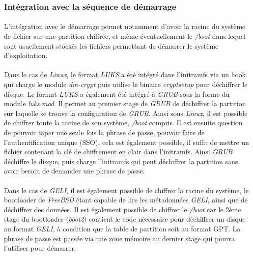 \subsubsection{Intégration avec la séquence de démarrage}
\paragraph{}
L'intégration avec le démarrage permet notamment d'avoir la racine du système 
de fichier sur une partition chiffrée, et même éventuellement le {\em /boot}
dans lequel sont usuellement stockés les fichiers permettant de démarrer le 
système d'exploitation.

\paragraph{}
Dans le cas de {\em Linux}, le format {\em LUKS} a été intégré dans
l'initramfs via un hook qui charge le module {\em dm-crypt} puis utilise 
le binaire {\em cryptsetup} pour déchiffrer le disque. 
Le format {\em LUKS} a également été intégré à {\em GRUB} sous la 
forme du module {\em luks.mod}. Il permet au premier stage de {\em GRUB} de 
déchiffrer la partition sur laquelle se trouve la configuration de {\em GRUB}.
Ainsi sous {\em Linux}, il est possible de chiffrer toute la racine de son 
système, {\em /boot} compris. Il est ensuite question de pouvoir taper une 
seule fois la phrase de passe, 
pouvoir faire de l'authentification unique (SSO), cela est 
également possible, il suffit de mettre un fichier contenant la clé de 
chiffrement en clair dans l'initramfs. Ainsi {\em GRUB} déchiffre le disque, 
puis charge l'initramfs qui peut déchiffrer la partition sans avoir besoin 
de demander une phrase de passe.

\paragraph{}
Dans le cas de {\em GELI}, il est également possible de chiffrer la racine du 
système, le bootloader de {\em FreeBSD} étant capable de lire les métadonnées 
{\em GELI}, ainsi que de déchiffrer des données. 
Il est également possible de chiffrer le 
{\em /boot} car le 2ème stage du bootloader ({\em boot2}) contient le code 
nécessaire pour déchiffrer un disque au format {\em GELI}, à condition que 
la table de partition soit au format GPT. La phrase de passe est passée via 
une zone mémoire au dernier stage qui pourra l'utiliser pour démarrer.

